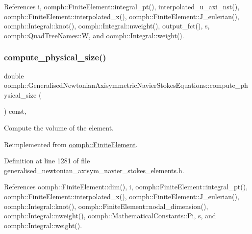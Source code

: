 References i, oomph\+::\+Finite\+Element\+::integral\+\_\+pt(), interpolated\+\_\+u\+\_\+axi\+\_\+nst(), oomph\+::\+Finite\+Element\+::interpolated\+\_\+x(), oomph\+::\+Finite\+Element\+::\+J\+\_\+eulerian(), oomph\+::\+Integral\+::knot(), oomph\+::\+Integral\+::nweight(), output\+\_\+fct(), s, oomph\+::\+Quad\+Tree\+Names\+::W, and oomph\+::\+Integral\+::weight().

\mbox{\label{classoomph_1_1GeneralisedNewtonianAxisymmetricNavierStokesEquations_a5105ddeca5782f2766dd198a3cd87e05}} 
\subsubsection{\texorpdfstring{compute\+\_\+physical\+\_\+size()}{compute\_physical\_size()}}
{\footnotesize\ttfamily double oomph\+::\+Generalised\+Newtonian\+Axisymmetric\+Navier\+Stokes\+Equations\+::compute\+\_\+physical\+\_\+size (\begin{DoxyParamCaption}{ }\end{DoxyParamCaption}) const\hspace{0.3cm}{\ttfamily [inline]}, {\ttfamily [virtual]}}



Compute the volume of the element. 



Reimplemented from \hyperlink{classoomph_1_1FiniteElement_a782a540035dc31cb6ef548d9d930d8b8}{oomph\+::\+Finite\+Element}.



Definition at line 1281 of file generalised\+\_\+newtonian\+\_\+axisym\+\_\+navier\+\_\+stokes\+\_\+elements.\+h.



References oomph\+::\+Finite\+Element\+::dim(), i, oomph\+::\+Finite\+Element\+::integral\+\_\+pt(), oomph\+::\+Finite\+Element\+::interpolated\+\_\+x(), oomph\+::\+Finite\+Element\+::\+J\+\_\+eulerian(), oomph\+::\+Integral\+::knot(), oomph\+::\+Finite\+Element\+::nodal\+\_\+dimension(), oomph\+::\+Integral\+::nweight(), oomph\+::\+Mathematical\+Constants\+::\+Pi, s, and oomph\+::\+Integral\+::weight().

